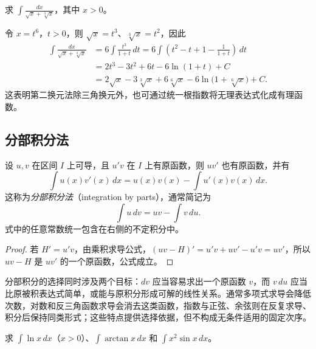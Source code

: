 \documentclass[UTF8,12pt,a4paper,fontset=fandol]{ctexbook}
\begin{document}
\begin{example}
\label{ex:common-denominator-substitution-for-radicals}
求 $\displaystyle\int\frac{dx}{\sqrt{x}+\sqrt[3]{x}}$，其中 $x>0$。
\end{example}

\begin{solve}
令 $x=t^6$，$t>0$，则 $\sqrt{x}=t^3$、$\sqrt[3]{x}=t^2$，因此
\begin{align*}
    \int\frac{dx}{\sqrt{x}+\sqrt[3]{x}}
       &=6\int\frac{t^3}{1+t}\,dt
        =6\int\left(t^2-t+1-\frac1{1+t}\right)\,dt\\
       &=2t^3-3t^2+6t-6\ln(1+t)+C\\
       &=2\sqrt{x}-3\sqrt[3]{x}+6\sqrt[6]{x}
           -6\ln\bigl(1+\sqrt[6]{x}\bigr)+C.
\end{align*}
这表明第二换元法除三角换元外，也可通过统一根指数将无理表达式化成有理函数。
\end{solve}

\subsection{分部积分法}
\label{subsec:integration-by-parts}

\begin{theorem}[分部积分公式]
\label{thm:integration-by-parts-indefinite}
设 $u,v$ 在区间 $I$ 上可导，且 $u'v$ 在 $I$ 上有原函数，则 $uv'$ 也有原函数，并有
\begin{equation}
    \int u(x)v'(x)\,dx=u(x)v(x)-\int u'(x)v(x)\,dx.
    \label{eq:integration-by-parts-indefinite}
\end{equation}
这称为\emph{分部积分法}（integration by parts），通常简记为
\[
    \int u\,dv=uv-\int v\,du.
\]
式中的任意常数统一包含在右侧的不定积分中。
\end{theorem}

\begin{proof}
若 $H'=u'v$，由乘积求导公式，$(uv-H)'=u'v+uv'-u'v=uv'$，所以 $uv-H$ 是 $uv'$ 的一个原函数，公式成立。
\end{proof}

分部积分的选择同时涉及两个目标：$dv$ 应当容易求出一个原函数 $v$，而 $v\,du$ 应当比原被积表达式简单，或能与原积分形成可解的线性关系。通常多项式求导会降低次数，对数和反三角函数求导会消去这类函数，指数与正弦、余弦则在反复求导、积分后保持同类形式；这些特点提供选择依据，但不构成无条件适用的固定次序。

\begin{example}
\label{ex:integration-by-parts-basic-examples}
求 $\displaystyle\int\ln x\,dx$（$x>0$）、$\displaystyle\int\arctan x\,dx$ 和 $\displaystyle\int x^2\sin x\,dx$。
\end{example}
\end{document}
